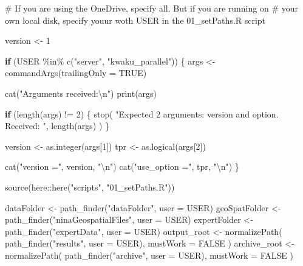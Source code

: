 \documentclass[
  letterpaper,
  DIV=11,
  numbers=noendperiod]{scrartcl}
\newenvironment{Shaded}{\begin{snugshade}}{\end{snugshade}}
\newcommand{\AttributeTok}[1]{\textcolor[rgb]{0.40,0.45,0.13}{#1}}
\newcommand{\CommentTok}[1]{\textcolor[rgb]{0.37,0.37,0.37}{#1}}
\newcommand{\ConstantTok}[1]{\textcolor[rgb]{0.56,0.35,0.01}{#1}}
\newcommand{\ControlFlowTok}[1]{\textcolor[rgb]{0.00,0.23,0.31}{\textbf{#1}}}
\newcommand{\DecValTok}[1]{\textcolor[rgb]{0.68,0.00,0.00}{#1}}
\newcommand{\FunctionTok}[1]{\textcolor[rgb]{0.28,0.35,0.67}{#1}}
\newcommand{\NormalTok}[1]{\textcolor[rgb]{0.00,0.23,0.31}{#1}}
\newcommand{\OtherTok}[1]{\textcolor[rgb]{0.00,0.23,0.31}{#1}}
\newcommand{\SpecialCharTok}[1]{\textcolor[rgb]{0.37,0.37,0.37}{#1}}
\newcommand{\StringTok}[1]{\textcolor[rgb]{0.13,0.47,0.30}{#1}}
\begin{document}
\begin{Shaded}
\begin{Highlighting}[]
\CommentTok{\# If you are using the OneDrive, specify all. But if you are running on}
\CommentTok{\# your own local disk, specify youur woth USER in the 01\_setPaths.R script}

\NormalTok{version }\OtherTok{\textless{}{-}} \DecValTok{1}

\ControlFlowTok{if}\NormalTok{ (USER }\SpecialCharTok{\%in\%} \FunctionTok{c}\NormalTok{(}\StringTok{"server"}\NormalTok{, }\StringTok{"kwaku\_parallel"}\NormalTok{)) \{}
\NormalTok{  args }\OtherTok{\textless{}{-}} \FunctionTok{commandArgs}\NormalTok{(}\AttributeTok{trailingOnly =} \ConstantTok{TRUE}\NormalTok{)}

  \FunctionTok{cat}\NormalTok{(}\StringTok{"Arguments received:}\SpecialCharTok{\textbackslash{}n}\StringTok{"}\NormalTok{)}
  \FunctionTok{print}\NormalTok{(args)}

  \ControlFlowTok{if}\NormalTok{ (}\FunctionTok{length}\NormalTok{(args) }\SpecialCharTok{!=} \DecValTok{2}\NormalTok{) \{}
    \FunctionTok{stop}\NormalTok{(}
      \StringTok{"Expected 2 arguments: version and option. Received: "}\NormalTok{,}
      \FunctionTok{length}\NormalTok{(args)}
\NormalTok{    )}
\NormalTok{  \}}

\NormalTok{  version }\OtherTok{\textless{}{-}} \FunctionTok{as.integer}\NormalTok{(args[}\DecValTok{1}\NormalTok{])}
\NormalTok{  tpr }\OtherTok{\textless{}{-}} \FunctionTok{as.logical}\NormalTok{(args[}\DecValTok{2}\NormalTok{])}

  \FunctionTok{cat}\NormalTok{(}\StringTok{"version ="}\NormalTok{, version, }\StringTok{"}\SpecialCharTok{\textbackslash{}n}\StringTok{"}\NormalTok{)}
  \FunctionTok{cat}\NormalTok{(}\StringTok{"use\_option ="}\NormalTok{, tpr, }\StringTok{"}\SpecialCharTok{\textbackslash{}n}\StringTok{"}\NormalTok{)}
\NormalTok{\}}

\FunctionTok{source}\NormalTok{(here}\SpecialCharTok{::}\FunctionTok{here}\NormalTok{(}\StringTok{"scripts"}\NormalTok{, }\StringTok{"01\_setPaths.R"}\NormalTok{))}

\NormalTok{dataFolder }\OtherTok{\textless{}{-}} \FunctionTok{path\_finder}\NormalTok{(}\StringTok{"dataFolder"}\NormalTok{, }\AttributeTok{user =}\NormalTok{ USER)}
\NormalTok{geoSpatFolder }\OtherTok{\textless{}{-}} \FunctionTok{path\_finder}\NormalTok{(}\StringTok{"ninaGeospatialFiles"}\NormalTok{, }\AttributeTok{user =}\NormalTok{ USER)}
\NormalTok{expertFolder }\OtherTok{\textless{}{-}} \FunctionTok{path\_finder}\NormalTok{(}\StringTok{"expertData"}\NormalTok{, }\AttributeTok{user =}\NormalTok{ USER)}
\NormalTok{output\_root }\OtherTok{\textless{}{-}} \FunctionTok{normalizePath}\NormalTok{(}
  \FunctionTok{path\_finder}\NormalTok{(}\StringTok{"results"}\NormalTok{, }\AttributeTok{user =}\NormalTok{ USER),}
  \AttributeTok{mustWork =} \ConstantTok{FALSE}
\NormalTok{)}
\NormalTok{archive\_root }\OtherTok{\textless{}{-}} \FunctionTok{normalizePath}\NormalTok{(}
  \FunctionTok{path\_finder}\NormalTok{(}\StringTok{"archive"}\NormalTok{, }\AttributeTok{user =}\NormalTok{ USER),}
  \AttributeTok{mustWork =} \ConstantTok{FALSE}
\NormalTok{)}



\end{Highlighting}
\end{Shaded}
\end{document}
